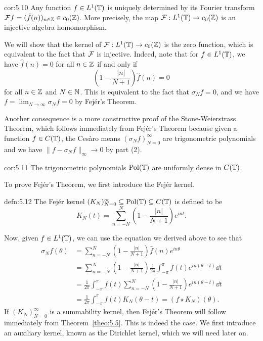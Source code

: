 \begin{cor}{cor:5.10}
    Any function $f \in L^1(\mathbb{T})$ is uniquely determined by its Fourier transform 
    ${\cal F}f = (\hat f(n))_{n\in\mathbb{Z}} \in c_0(\mathbb{Z})$. More precisely, the 
    map ${\cal F} : L^1(\mathbb{T}) \to c_0(\mathbb{Z})$ is an injective algebra homomorphism. 
\end{cor}
\begin{pf}
    We will show that the kernel of ${\cal F} : L^1(\mathbb{T}) \to c_0(\mathbb{Z})$ is the zero 
    function, which is equivalent to the fact that ${\cal F}$ is injective. 
    Indeed, note that for $f \in L^1(\mathbb{T})$, we have $\hat f(n) = 0$ for all $n \in \mathbb{Z}$ 
    if and only if 
    \[ \left( 1 - \frac{|n|}{N+1} \right) \hat f(n) = 0 \] 
    for all $n \in \mathbb{Z}$ and $N \in \mathbb{N}$. This is equivalent to the fact that 
    $\sigma_N f = 0$, and we have $f = \lim_{N\to\infty} \sigma_N f = 0$ by 
    Fej\'er's Theorem. 
\end{pf}

Another consequence is a more constructive proof of the Stone-Weierstrass 
Theorem, which follows immediately from Fej\'er's Theorem because 
given a function $f \in C(\mathbb{T})$, the Ces\`aro means $(\sigma_N f)_{N=0}^\infty$
are trigonometric polynomials and we have $\|f - \sigma_N f\|_\infty \to 0$ 
by part (2). 

\begin{cor}{cor:5.11}
    The trigonometric polynomials $\operatorname{Pol}(\mathbb{T})$ are uniformly dense in $C(\mathbb{T})$. 
\end{cor}

To prove Fej\'er's Theorem, we first introduce the Fej\'er kernel. 

\begin{defn}{defn:5.12}
    The Fej\'er kernel $(K_N)_{N=0}^\infty \subseteq \operatorname{Pol}(\mathbb{T}) \subseteq C(\mathbb{T})$ is 
    defined to be 
    \[ K_N(t) = \sum_{n=-N}^N \left( 1 - \frac{|n|}{N+1} \right) e^{int}. \] 
\end{defn}

Now, given $f \in L^1(\mathbb{T})$, we can use the equation we derived above to see that 
\begin{align*}
    \sigma_N f (\theta) 
    &= \sum_{n=-N}^N \left( 1 - \frac{|n|}{N+1} \right) \hat f(n) e^{in\theta} \\ 
    &= \sum_{n=-N}^N \left( 1 - \frac{|n|}{N+1} \right) \frac{1}{2\pi} 
    \int_{-\pi}^\pi f(t) e^{in(\theta - t)}\dd t \\ 
    &= \frac{1}{2\pi} \int_{-\pi}^\pi f(t) \sum_{n=-N}^N \left( 1 - 
    \frac{|n|}{N+1} \right) e^{in(\theta - t)}\dd t \\ 
    &= \frac{1}{2\pi} \int_{-\pi}^\pi f(t) K_N(\theta - t) = (f \star K_N)(\theta). 
\end{align*}
If $(K_N)_{N=0}^\infty$ is a summability kernel, then Fej\'er's Theorem will follow 
immediately from Theorem~\ref{theo:5.5}. This is indeed the case. 
We first introduce an auxiliary kernel, known as the Dirichlet kernel, which 
we will need later on. 

